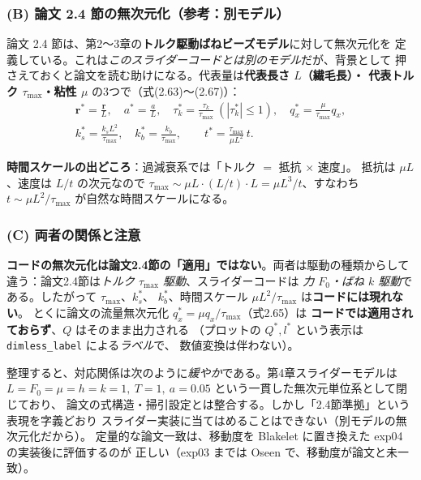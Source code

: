 \documentclass[11pt,a4paper]{article}
\newcommand{\rv}{\bm{r}}
\begin{document}
\subsubsection{(B) 論文 2.4 節の無次元化（参考：別モデル）}

論文 2.4 節は、第2〜3章の\textbf{トルク駆動ばねビーズモデル}に対して無次元化を
定義している。これは\emph{このスライダーコードとは別のモデル}だが、背景として
押さえておくと論文を読む助けになる。代表量は\textbf{代表長さ $L$（繊毛長）・
代表トルク $\tau_{\max}$・粘性 $\mu$} の3つで（式(2.63)〜(2.67)）：
\begin{gather}
\rv^{\ast}=\frac{\rv}{L},\quad a^{\ast}=\frac{a}{L},\quad
\tau_k^{\ast}=\frac{\tau_k}{\tau_{\max}}\ (|\tau_k^{\ast}|\le1),\quad
q_x^{\ast}=\frac{\mu}{\tau_{\max}}q_x,\\[4pt]
k_s^{\ast}=\frac{k_s L^2}{\tau_{\max}},\quad k_b^{\ast}=\frac{k_b}{\tau_{\max}},\qquad
t^{\ast}=\frac{\tau_{\max}}{\mu L^2}\,t.
\end{gather}

\begin{keybox}
\textbf{時間スケールの出どころ}：過減衰系では「トルク $=$ 抵抗 $\times$ 速度」。
抵抗は $\mu L$、速度は $L/t$ の次元なので $\tau_{\max}\sim\mu L\cdot(L/t)\cdot L
=\mu L^3/t$、すなわち $t\sim\mu L^2/\tau_{\max}$ が自然な時間スケールになる。
\end{keybox}

\subsubsection{(C) 両者の関係と注意}

\begin{warnbox}
\textbf{コードの無次元化は論文2.4節の「適用」ではない}。両者は駆動の種類からして
違う：論文2.4節は\emph{トルク $\tau_{\max}$ 駆動}、スライダーコードは
\emph{力 $F_0$・ばね $k$ 駆動}である。したがって $\tau_{\max}$、$k_s^{\ast}$、
$k_b^{\ast}$、時間スケール $\mu L^2/\tau_{\max}$ は\textbf{コードには現れない}。
とくに論文の流量無次元化 $q_x^{\ast}=\mu q_x/\tau_{\max}$（式2.65）は
\textbf{コードでは適用されておらず}、$Q$ はそのまま出力される
（プロットの $Q^\ast,l^\ast$ という表示は \texttt{dimless\_label} による\emph{ラベル}で、
数値変換は伴わない）。
\end{warnbox}

整理すると、対応関係は次のように\emph{緩やか}である。第4章スライダーモデルは
$L=F_0=\mu=h=k=1,\ T=1,\ a=0.05$ という一貫した無次元単位系として閉じており、
論文の式構造・掃引設定とは整合する。しかし「2.4節準拠」という表現を字義どおり
スライダー実装に当てはめることはできない（別モデルの無次元化だから）。
定量的な論文一致は、移動度を Blakelet に置き換えた exp04 の実装後に評価するのが
正しい（exp03 までは Oseen で、移動度が論文と未一致）。
\end{document}
